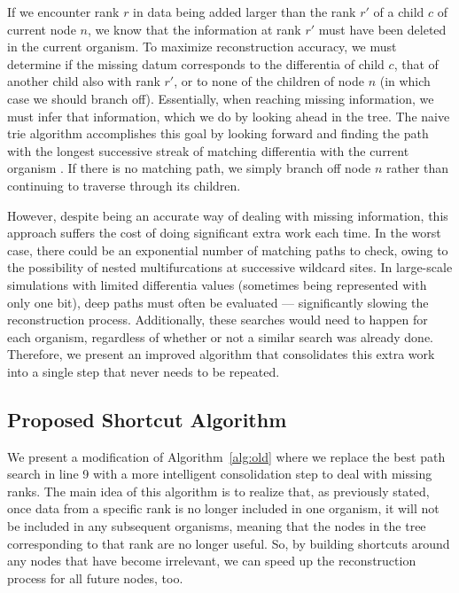 If we encounter rank $r$ in data being added larger than the rank $r'$ of a child $c$ of current node $n$, we know that the information at rank $r'$ must have been deleted in the current organism.
To maximize reconstruction accuracy, we must determine if the missing datum corresponds to the differentia of child $c$, that of another child also with rank $r'$, or to none of the children of node $n$ (in which case we should branch off).
Essentially, when reaching missing information, we must infer that information, which we do by looking ahead in the tree.
The naive  trie algorithm accomplishes this goal by looking forward and finding the path with the longest successive streak of matching differentia with the current organism \citep{moreno2024analysis}.
If there is no matching path, we simply branch off node $n$ rather than continuing to traverse through its children.

However, despite being an accurate way of dealing with missing information, this approach suffers the cost of doing significant extra work each time.
In the worst case, there could be an exponential number of matching paths to check, owing to the possibility of nested multifurcations at successive wildcard sites.
In large-scale simulations with limited differentia values (sometimes being represented with only one bit), deep paths must often be evaluated --- significantly slowing the reconstruction process.
Additionally, these searches would need to happen for each organism, regardless of whether or not a similar search was already done.
Therefore, we present an improved algorithm that consolidates this extra work into a single step that never needs to be repeated.

\subsection{Proposed Shortcut Algorithm} \label{sec:algorithm:shortcut}



We present a modification of Algorithm~\ref{alg:old} where we replace the best path search in line 9 with a more intelligent consolidation step to deal with missing ranks.
The main idea of this algorithm is to realize that, as previously stated, once data from a specific rank is no longer included in one organism, it will not be included in any subsequent organisms, meaning that the nodes in the tree corresponding to that rank are no longer useful.
So, by building shortcuts around any nodes that have become irrelevant, we can speed up the reconstruction process for all future nodes, too.

